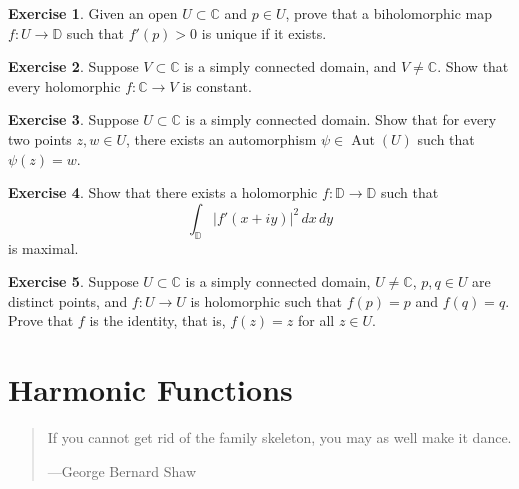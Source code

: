 \documentclass[12pt,openany]{book}
\newcommand{\Aut}{\operatorname{Aut}}
\newcommand{\abs}[1]{\left\lvert {#1} \right\rvert}
\newcommand{\C}{{\mathbb{C}}}
\newcommand{\D}{{\mathbb{D}}}
\theoremstyle{plain}
\theoremstyle{remark}
\theoremstyle{definition}
\newenvironment{exbox}{%
    \def\FrameCommand{\vrule width 1pt \relax\hspace {10pt}}%
    \MakeFramed {\advance \hsize -\width \FrameRestore }%
}{%
    \endMakeFramed
}
\newenvironment{myquote}{%
    \begin{quote}%
    \begingroup\itshape
}{%
    \endgroup%
    \end{quote}
}
\theoremstyle{exercise}
\newtheorem{exercise}{Exercise}[section]
\theoremstyle{example}
\begin{document}
\begin{exbox}
\begin{exercise}
Given an open $U \subset \C$ and $p \in U$, prove
that a biholomorphic map
$f \colon U \to \D$ such that $f'(p) > 0$ is unique if it exists.
\end{exercise}

\begin{exercise}
Suppose $V \subset \C$ is a simply connected domain, and $V \not= \C$.
Show that every holomorphic $f \colon \C \to V$ is constant.
\end{exercise}

\begin{exercise}
Suppose $U \subset \C$ is a simply connected domain.
Show that for every two points $z,w \in U$, there exists an automorphism
$\psi \in \Aut(U)$ such that $\psi(z) = w$.
\end{exercise}

\begin{exercise}
Show that there exists
a holomorphic $f \colon \D \to \D$ such that
\begin{equation*}
\int_{\D} \abs{f'(x+iy)}^2 \, dx \, dy
\end{equation*}
is maximal.
\end{exercise}

\begin{exercise}
Suppose $U \subset \C$ is a simply connected domain, $U \not= \C$,
$p,q \in U$ are distinct points, and
$f \colon U \to U$ is holomorphic such that $f(p) = p$ and $f(q)=q$.
Prove that $f$ is the identity, that is, $f(z)=z$ for all $z \in U$.
\end{exercise}
\end{exbox}


\chapter{Harmonic Functions} \label{ch:harmonic}

\begin{myquote}
If you cannot get rid of the family skeleton, you may as well make it
dance.

---George Bernard Shaw
\end{myquote}
\end{document}
